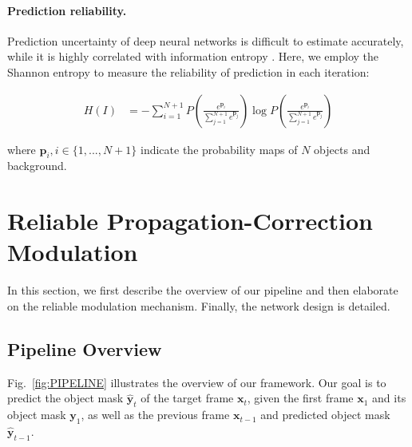 \documentclass[letterpaper]{article} \usepackage{aaai22}  \usepackage{times}  \usepackage{helvet}  \usepackage{courier}  \usepackage[hyphens]{url}  \usepackage{graphicx} \urlstyle{rm} \def\UrlFont{\rm}  \usepackage{natbib}  \usepackage{caption} \DeclareCaptionStyle{ruled}{labelfont=normalfont,labelsep=colon,strut=off} \frenchspacing  \setlength{\pdfpagewidth}{8.5in}  \setlength{\pdfpageheight}{11in}  \usepackage{algorithm}
\newcommand{\fig}[1]{Fig.~#1}
\begin{document}
\paragraph{Prediction reliability.}
Prediction uncertainty of deep neural networks is difficult to estimate accurately, while it is highly correlated with information entropy \cite{272494}. Here, we employ the Shannon entropy to measure the reliability of prediction in each iteration:
\begin{small}
\begin{eqnarray}
\label{eq:shannon_entropy}
H(I) &= -\sum_{i=1}^{N+1} P (\frac{e^{\mathbf{p}_{i}}}{\sum_{j=1}^{N+1} e^{\mathbf{p}_{j}}}) \log P (\frac{e^{\mathbf{p}_{i}}}{\sum_{j=1}^{N+1} e^{\mathbf{p}_{j}}})
\end{eqnarray}
\end{small}
where $\mathbf{p}_{i}, i \in \{1, ..., N+1\}$ indicate the probability maps of $N$ objects and background.


\section{Reliable Propagation-Correction Modulation}\label{sec:modulation}
In this section, we first describe the overview of our pipeline and then elaborate on the reliable modulation mechanism. Finally, the network design is detailed.

\subsection{Pipeline Overview}
\fig{\ref{fig:PIPELINE}} illustrates the overview of our framework. Our goal is to predict the object mask $\hat{\mathbf{y}}_t$ of the target frame $\mathbf{x}_t$, given the first frame $\mathbf{x}_1$ and its object mask $\mathbf{y}_1$, as well as the previous frame $\mathbf{x}_{t-1}$ and predicted object mask $\hat{\mathbf{y}}_{t-1}$.
\end{document}
